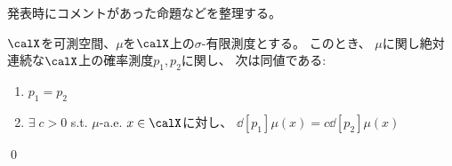\documentclass[report]{jlreq}
\begin{document}
%

発表時にコメントがあった命題などを整理する。

\begin{fact}
    $\calX$を可測空間、$\mu$を$\calX$上の$\sigma$-有限測度とする。
    このとき、
    $\mu$に関し絶対連続な$\calX$上の確率測度$p_1, p_2$に関し、
    次は同値である:
    \begin{enumerate}
        \item $p_1 = p_2$
        \item $\exists \; c > 0$ \quad s.t. \quad
            $\mu$-a.e. $x \in \calX$に対し、
            $\dd[p_1]{\mu}(x) = c \dd[p_2]{\mu}(x)$
    \end{enumerate}
    \qed
\end{fact}
\end{document}
